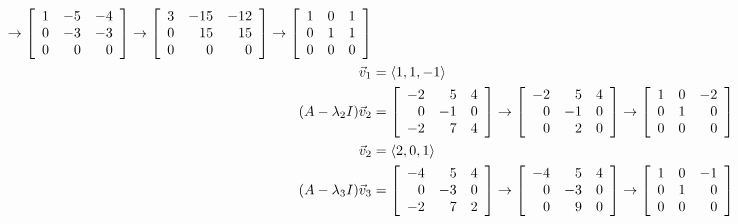 \documentclass{letter}
\newcommand{\Ve}[1]{\langle #1 \rangle}
\newcommand{\Vn}[1]{\vec{#1}}
\newcommand{\?}{\stackrel{?}{=}}
\newenvironment{Mat}[1]{%
  \left[\begin{array}{*{#1}{r}}
}{%
  \end{array}\right]
}
\begin{document}
\begin{enumerate}
\begin{enumerate}[label=(\alph*)]
{\begin{align*}
                                \to \begin{Mat}{3} 1 & -5 & -4 \\ 0 & -3 & -3 \\ 0 & 0 & 0 \end{Mat}
                                \to \begin{Mat}{3} 3 & -15 & -12 \\ 0 & 15 & 15 \\ 0 & 0 & 0 \end{Mat}
                                \to \begin{Mat}{3} 1 & 0 & 1 \\ 0 & 1 & 1 \\ 0 & 0 & 0 \end{Mat}\\
                        \Vn{v}_1 &= \Ve{1,1,-1}\\
         (A-\lambda_2 I)\Vn{v}_2 &= \begin{Mat}{3} -2 & 5 &  4 \\ 0 & -1 & 0 \\ -2 & 7 & 4 \end{Mat}
                                \to \begin{Mat}{3} -2 & 5 &  4 \\ 0 & -1 & 0 \\  0 & 2 & 0 \end{Mat}
                                \to \begin{Mat}{3}  1 & 0 & -2 \\ 0 &  1 & 0 \\  0 & 0 & 0 \end{Mat} \\
                        \Vn{v}_2 &= \Ve{2, 0, 1}\\
         (A-\lambda_3 I)\Vn{v}_3 &= \begin{Mat}{3} -4 & 5 &  4 \\ 0 & -3 & 0 \\ -2 & 7 & 2 \end{Mat}
                                \to \begin{Mat}{3} -4 & 5 &  4 \\ 0 & -3 & 0 \\  0 & 9 & 0 \end{Mat}
                                \to \begin{Mat}{3}  1 & 0 & -1 \\ 0 &  1 & 0 \\  0 & 0 & 0 \end{Mat} \\

\end{align*}}
\end{enumerate}
\end{enumerate}
\end{document}
